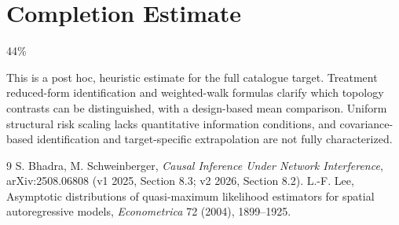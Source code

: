 \documentclass[11pt]{article}
\theoremstyle{definition}
\begin{document}
\section{Completion Estimate}
44\%

This is a post hoc, heuristic estimate for the full catalogue target.
Treatment reduced-form identification and weighted-walk formulas clarify which topology contrasts can be distinguished, with a design-based mean comparison. Uniform structural risk scaling lacks quantitative information conditions, and covariance-based identification and target-specific extrapolation are not fully characterized.

\begin{thebibliography}{9}
 S. Bhadra, M. Schweinberger, \emph{Causal Inference Under Network Interference}, arXiv:2508.06808 (v1 2025, Section 8.3; v2 2026, Section 8.2).
 L.-F. Lee, Asymptotic distributions of quasi-maximum likelihood estimators for spatial autoregressive models,
\emph{Econometrica} 72 (2004), 1899--1925.
\end{thebibliography}
\end{document}
